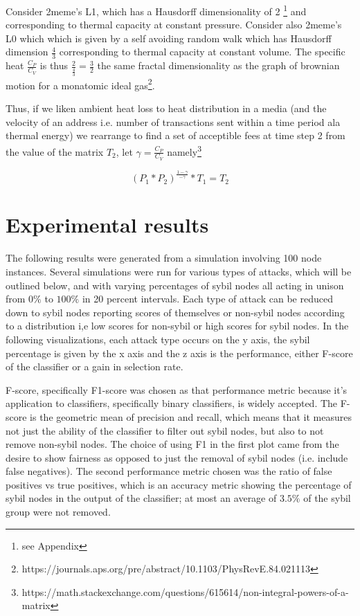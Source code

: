 \documentclass{article}
\theoremstyle{definition}
\theoremstyle{remark}
\theoremstyle{plain}
\begin{document}
Consider 2meme's L1, which has a Hausdorff dimensionality of 2 \footnote{see Appendix} and corresponding to thermal capacity at constant pressure. Consider also 2meme's L0 which which is given by a self avoiding random walk which has Hausdorff dimension $\frac{4}{3}$ corresponding to thermal capacity at constant volume. The specific heat $\frac{C_P}{C_V}$ is thus $\frac{2}{\frac{4}{3}} = \frac{3}{2}$ the same fractal dimensionality as the graph of brownian motion for a monatomic ideal gas\footnote{https://journals.aps.org/pre/abstract/10.1103/PhysRevE.84.021113}.


Thus, if we liken ambient heat loss to heat distribution in a media (and the velocity of an address i.e. number of transactions sent within a time period ala thermal energy) 
we rearrange to find a set of acceptible fees at time step 2 from the value of the matrix $T_2$, let $ \gamma = \frac{C_P}{C_V}$ namely\footnote{https://math.stackexchange.com/questions/615614/non-integral-powers-of-a-matrix}

\begin{equation}
(P_1 *P_2)^\frac{1- \gamma }{-\gamma} * T_1 = T_2
\end{equation}

\section{Experimental results}
The following results were generated from a simulation involving 100 node instances. Several simulations were run for various types of attacks, which will be outlined below, and with varying percentages of sybil nodes all acting in unison from $0\%$ to $100\%$ in 20 percent intervals. Each type of attack can be reduced down to sybil nodes reporting scores of themselves or non-sybil nodes according to a distribution i,e low scores for non-sybil or high scores for sybil nodes. In the following visualizations, each attack type occurs on the y axis, the sybil percentage is given by the x axis and the z axis is the performance, either F-score of the classifier or a gain in selection rate.

F-score, specifically F1-score was chosen as that performance metric because it's application to classifiers, specifically binary classifiers, is widely accepted. The F-score is the geometric mean of precision and recall, which means that it measures not just the ability of the classifier to filter out sybil nodes, but also to not remove non-sybil nodes. The choice of using F1 in the first plot came from the desire to show fairness as opposed to just the removal of sybil nodes (i.e. include false negatives). The second performance metric chosen was the ratio of false positives vs true positives, which is an accuracy metric showing the percentage of sybil nodes in the output of the classifier; at most an average of $3.5\%$ of the sybil group were not removed. 
\end{document}

